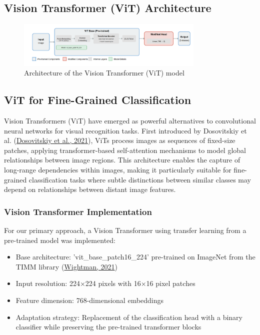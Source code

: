 \documentclass[a4paper,12pt]{report}
\begin{document}
\subsection{Vision Transformer (ViT) Architecture}

\begin{figure}[h]
    \centering
    \includegraphics[width=0.8\textwidth]{images/architecture/vit.png}
    \caption{Architecture of the Vision Transformer (ViT) model}
    \label{fig:vit_architecture}
\end{figure}

\subsection{ViT for Fine-Grained Classification}

Vision Transformers (ViT) have emerged as powerful alternatives to convolutional neural networks for visual recognition tasks. First introduced by Dosovitskiy et al. (\href{https://arxiv.org/abs/2010.11929}{Dosovitskiy et al., 2021}), ViTs process images as sequences of fixed-size patches, applying transformer-based self-attention mechanisms to model global relationships between image regions. This architecture enables the capture of long-range dependencies within images, making it particularly suitable for fine-grained classification tasks where subtle distinctions between similar classes may depend on relationships between distant image features.

\subsubsection{Vision Transformer Implementation}

For our primary approach, a Vision Transformer using transfer learning from a pre-trained model was implemented:

\begin{itemize}
    \item Base architecture: 'vit\_base\_patch16\_224' pre-trained on ImageNet from the TIMM library (\href{https://github.com/rwightman/pytorch-image-models}{Wightman, 2021})
    \item Input resolution: 224×224 pixels with 16×16 pixel patches
    \item Feature dimension: 768-dimensional embeddings
    \item Adaptation strategy: Replacement of the classification head with a binary classifier while preserving the pre-trained transformer blocks
\end{itemize}
\end{document}
